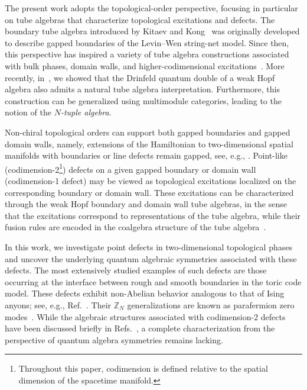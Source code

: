 \documentclass[a4paper,11pt]{article}
\theoremstyle{definition}
\theoremstyle{remark}
\begin{document}
The present work adopts the topological-order perspective, focusing in particular on tube algebras that characterize topological excitations and defects. The boundary tube algebra introduced by Kitaev and Kong~\cite{Kitaev2012boundary} was originally developed to describe gapped boundaries of the Levin--Wen string-net model. Since then, this perspective has inspired a variety of tube algebra constructions associated with bulk phases, domain walls, and higher-codimensional excitations~\cite{bridgeman2020computing,bai2025weakhopf,jia2024weakTube,Barter2019domainwall,Barter2022computing,jia2025tube,Bullivant2019tube}.
More recently, in~\cite{jia2025tube}, we showed that the Drinfeld quantum double of a weak Hopf algebra also admits a natural tube algebra interpretation. Furthermore, this construction can be generalized using multimodule categories, leading to the notion of the \emph{$N$-tuple algebra}.


Non-chiral topological orders can support both gapped boundaries and gapped domain walls, namely, extensions of the Hamiltonian to two-dimensional spatial manifolds with boundaries or line defects remain gapped, see, e.g., \cite{Beigi2011the,Kitaev2012boundary,Levin2013protected,Cong2017,wang2020electric,kapustin2011topological,Barkeshli2013theory,Lan2015gapped,hu2018boundary,Lan2020Gapped,jia2023boundary,Jia2023weak,jia2024weakTube,jia2025tube,jia2024generalized,Jia2026weakhopf}.
Point-like (codimension-2\footnote{Throughout this paper, codimension is defined relative to the spatial dimension of the spacetime manifold.}) defects on a given gapped boundary or domain wall (codimension-1 defect) may be viewed as topological excitations localized on the corresponding boundary or domain wall.
These excitations can be characterized through the weak Hopf boundary and domain wall tube algebras, in the sense that the excitations correspond to representations of the tube algebra, while their fusion rules are encoded in the coalgebra structure of the tube algebra~\cite{Kitaev2012boundary,bridgeman2023invertible,jia2024weakTube,jia2025tube,bai2025weakhopf,Liu2026alterfold}.




In this work, we investigate point defects in two-dimensional topological phases and uncover the underlying quantum algebraic symmetries associated with these defects. 
The most extensively studied examples of such defects are those occurring at the interface between rough and smooth boundaries in the toric code model. These defects exhibit non-Abelian behavior analogous to that of Ising anyons; see, e.g., Ref.~\cite{Sarma2015defect}. Their $\mathbb{Z}_N$ generalizations are known as parafermion zero modes~\cite{Cheng2012defect}.
While the algebraic structures associated with codimension-2 defects have been discussed briefly in Refs.~\cite{Kitaev2012boundary,bridgeman2020computing}, a complete characterization from the perspective of quantum algebra symmetries remains lacking.
\end{document}
